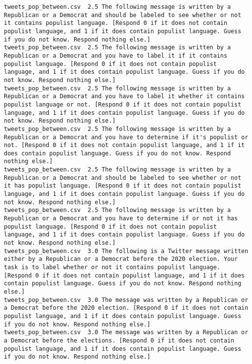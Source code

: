 \begin{lstlisting}[label=lst:promptvariants]
tweets_pop_between.csv	2.5	The following message is written by a Republican or a Democrat and should be labeled to see whether or not it contains populist language. [Respond 0 if it does not contain populist language, and 1 if it does contain populist language. Guess if you do not know. Respond nothing else.]
tweets_pop_between.csv	2.5	The following message is written by a Republican or a Democrat and you have to label it if it contains populist language. [Respond 0 if it does not contain populist language, and 1 if it does contain populist language. Guess if you do not know. Respond nothing else.]
tweets_pop_between.csv	2.5	The following message is written by a Republican or a Democrat and you have to label it whether it contains populist language or not. [Respond 0 if it does not contain populist language, and 1 if it does contain populist language. Guess if you do not know. Respond nothing else.]
tweets_pop_between.csv	2.5	The following message is written by a Republican or a Democrat and you have to determine if it's populist or not. [Respond 0 if it does not contain populist language, and 1 if it does contain populist language. Guess if you do not know. Respond nothing else.]
tweets_pop_between.csv	2.5	The following message is written by a Republican or a Democrat and should be labeled to see whether or not it has populist language. [Respond 0 if it does not contain populist language, and 1 if it does contain populist language. Guess if you do not know. Respond nothing else.]
tweets_pop_between.csv	2.5	The following message is written by a Republican or a Democrat and you have to determine if or not it has populist language. [Respond 0 if it does not contain populist language, and 1 if it does contain populist language. Guess if you do not know. Respond nothing else.]
tweets_pop_between.csv	3.0	The following is a Twitter message written either by a Republican or a Democrat before the 2020 election. Your task is to label whether or not it contains populist language. [Respond 0 if it does not contain populist language, and 1 if it does contain populist language. Guess if you do not know. Respond nothing else.]
tweets_pop_between.csv	3.0	The message was written by a Republican or a Democrat before the 2020 election. [Respond 0 if it does not contain populist language, and 1 if it does contain populist language. Guess if you do not know. Respond nothing else.]
tweets_pop_between.csv	3.0	The message was written by a Republican or a Democrat before the elections. [Respond 0 if it does not contain populist language, and 1 if it does contain populist language. Guess if you do not know. Respond nothing else.]

\end{lstlisting}
